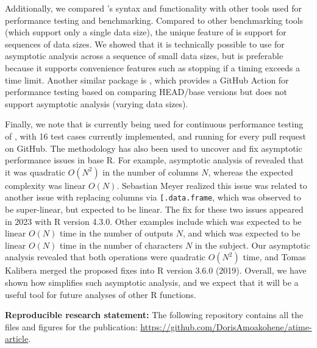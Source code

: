 Additionally, we compared 's syntax and functionality with other tools used for performance testing and benchmarking. 
Compared to other benchmarking tools (which support only a single data size), the unique feature of  is support for sequences of data sizes. 
We showed that it is technically possible to use  for asymptotic analysis across a sequence of small data sizes, but  is preferable because it supports convenience features such as stopping if a timing exceeds a time limit.
Another similar package is , which provides a GitHub Action for performance testing based on comparing HEAD/base versions but does not support asymptotic analysis (varying data sizes).

Finally, we note that  is currently being used for continuous performance testing of , with 16 test cases currently implemented, and running for every pull request on GitHub.
The  methodology has also been used to uncover and fix asymptotic performance issues in base R.
For example, asymptotic analysis of  revealed that it was quadratic $O(N^2)$ in the number of columns $N$, whereas the expected complexity was linear $O(N)$.
Sebastian Meyer realized this issue was related to another issue with replacing columns via \verb|[.data.frame|, which was observed to be super-linear, but expected to be linear.
The fix for these two issues appeared in 2023 with R version 4.3.0.
Other examples include  which was expected to be linear $O(N)$ time in the number of outputs $N$, and  which was expected to be linear $O(N)$ time in the number of characters $N$ in the subject. 
Our asymptotic analysis revealed that both operations were quadratic $O(N^2)$ time, and Tomas Kalibera merged the proposed fixes into R version 3.6.0 (2019).
Overall, we have shown how  simplifies such asymptotic analysis, and we expect that it will be a useful tool for future analyses of other R functions.

\textbf{Reproducible research statement:} The following repository contains all the files and figures for the publication: \href{https://github.com/DorisAmoakohene/atime-article}{https://github.com/DorisAmoakohene/atime-article}.



\newpage
